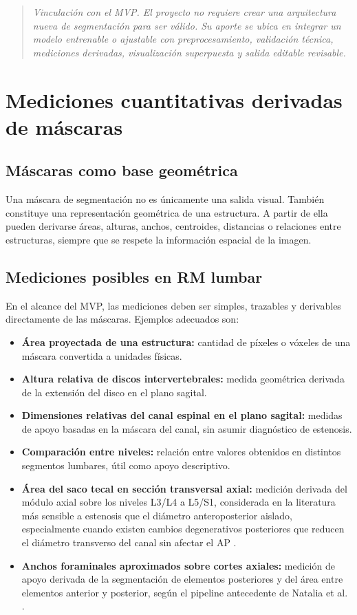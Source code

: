 \begin{quote}
\itshape
Vinculación con el MVP. El proyecto no requiere crear una arquitectura nueva de segmentación para ser válido. Su aporte se ubica en integrar un modelo entrenable o ajustable con preprocesamiento, validación técnica, mediciones derivadas, visualización superpuesta y salida editable revisable.
\end{quote}

\section{Mediciones cuantitativas derivadas de máscaras}

\subsection{Máscaras como base geométrica}

Una máscara de segmentación no es únicamente una salida visual. También constituye una representación geométrica de una estructura. A partir de ella pueden derivarse áreas, alturas, anchos, centroides, distancias o relaciones entre estructuras, siempre que se respete la información espacial de la imagen.

\subsection{Mediciones posibles en RM lumbar}

En el alcance del MVP, las mediciones deben ser simples, trazables y derivables directamente de las máscaras. Ejemplos adecuados son:

\begin{itemize}
    \item \textbf{Área proyectada de una estructura:} cantidad de píxeles o vóxeles de una máscara convertida a unidades físicas.
    \item \textbf{Altura relativa de discos intervertebrales:} medida geométrica derivada de la extensión del disco en el plano sagital.
    \item \textbf{Dimensiones relativas del canal espinal en el plano sagital:} medidas de apoyo basadas en la máscara del canal, sin asumir diagnóstico de estenosis.
    \item \textbf{Comparación entre niveles:} relación entre valores obtenidos en distintos segmentos lumbares, útil como apoyo descriptivo.
    \item \textbf{Área del saco tecal en sección transversal axial:} medición derivada del módulo axial sobre los niveles L3/L4 a L5/S1, considerada en la literatura más sensible a estenosis que el diámetro anteroposterior aislado, especialmente cuando existen cambios degenerativos posteriores que reducen el diámetro transverso del canal sin afectar el AP \parencite{pfirrmann_disc_degeneration_2001}.
    \item \textbf{Anchos foraminales aproximados sobre cortes axiales:} medición de apoyo derivada de la segmentación de elementos posteriores y del área entre elementos anterior y posterior, según el pipeline antecedente de Natalia et al. \parencite{natalia_measurement_2020}.
\end{itemize}

